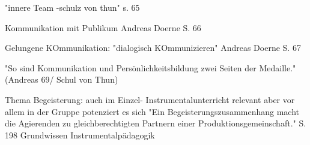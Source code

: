 "innere Team -schulz von thun" s. 65

Kommunikation mit Publikum Andreas Doerne S. 66

Gelungene KOmmunikation: "dialogisch KOmmunizieren" Andreas Doerne S. 67

"So sind Kommunikation und Persönlichkeitsbildung zwei Seiten der Medaille."
(Andreas 69/ Schul von Thun)


Thema Begeisterung: auch im Einzel- Instrumentalunterricht relevant aber vor allem in der Gruppe potenziert es
sich "Ein Begeisterungszusammenhang macht die Agierenden zu gleichberechtigten
Partnern einer Produktionsgemeinschaft." S. 198 Grundwissen
Instrumentalpädagogik

